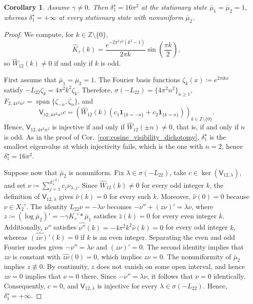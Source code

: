 \documentclass[letterpaper, 10pt, conference]{ieeeconf}
\newtheorem{corollary}[theorem]{Corollary}
\newcommand{\ind}{\mathbf{1}}
\begin{document}
\begin{corollary}
    \label{cor:cell_sorting_visibility_dichotomy}
    Assume $\gamma \neq 0$. 
    Then $\delta_1^\star = 16\pi^2$ at the stationary state $\bar\mu_1 = \bar\mu_2 = 1$, whereas $\delta_1^\star = +\infty$ at every stationary state with nonuniform $\bar\mu_2$.
\end{corollary}

\begin{proof}
    We compute, for $k \in \mathbb{Z} \setminus \{0\}$,
    \[
    \widehat{K}_\tau(k) = \frac{e^{-2\pi^2\tau^2(k^2-1)}}{2\pi k} \sin\left(\frac{\pi k}{2}\right),
    \]
    so $\widehat{W}_{12}(k) \neq 0$ if and only if $k$ is odd.
    
    First assume that $\bar\mu_1 = \bar\mu_2 = 1$.
    The Fourier basis functions $\zeta_k(x) \coloneqq e^{2\pi\mathrm{i}k x}$ satisfy $-L_{22} \zeta_k = 4 \pi^2 k^2 \zeta_k$.
    Therefore, $\sigma(-L_{22}) = \{4 \pi^2 n^2\}_{n \ge 1}$, $F_{2, 4\pi^2n^2} = \operatorname{span}\{\zeta_{-n}, \zeta_n\}$,
    and 
    \[
    \mathsf{V}_{12, 4\pi^2 n^2} c = \left(\widehat{W}_{12}(k)(c_1 \ind_{\{k=-n\}} + c_2 \ind_{\{k=n\}})\right)_{k \in \mathbb{Z} \setminus \{0\}}.
    \]
    Hence, $\mathsf{V}_{12,4\pi^2n^2}$ is injective if and only if $\widehat{W}_{12}(\pm n) \neq 0$, that is, if and only if $n$ is odd.
    As in the proof of Cor.~\ref{cor:cosine_visibility_dichotomy}, $\delta_1^\star$ is the smallest eigenvalue at which injectivity fails, which is the one with $n = 2$, hence $\delta_1^\star = 16\pi^2$.
    
    Suppose now that $\bar\mu_2$ is nonuniform.
    Fix $\lambda \in \sigma(-L_{22})$, take $c \in \ker(\mathsf{V}_{12,\lambda})$, and set $\nu \coloneqq \sum_{j=1}^{d_\lambda^{(2)}} c_j \nu_{\lambda,j}$.
    Since $\widehat{W}_{12}(k) \neq 0$ for every odd integer $k$, the definition of $\mathsf{V}_{12,\lambda}$ gives $\widehat\nu(k) = 0$ for every such $k$.
    Moreover, $\widehat\nu(0) = 0$ because $\nu \in X_2'$.
    The identity $L_{22}\nu = -\lambda\nu$ becomes $-\nu'' + (z\nu)' = \lambda\nu$, where $z \coloneqq (\log\bar\mu_2)' = -\gamma K_\tau' \ast \bar\mu_1$ satisfies $\widehat{z}(k) = 0$ for every even integer $k$.
    Additionally, $\nu''$ satisfies $\widehat{\nu''}(k) = -4 \pi^2 k^2 \widehat{\nu}(k) = 0$ for every odd integer $k$, whereas $\widehat{(z \nu)'}(k) = 0$ if $k$ is an even integer.
    Separating the even and odd Fourier modes gives $-\nu'' = \lambda \nu$ and $(z\nu)' = 0$.
    The second identity implies that $z \nu$ is constant with $\widehat{z\nu}(0) = 0$, which implies $z \nu = 0$.
    The nonuniformity of $\bar\mu_2$ implies $z \not \equiv 0$.
    By continuity, $z$ does not vanish on some open interval, and hence $z\nu = 0$ implies that $\nu = 0$ there.
    Since $-\nu'' = \lambda\nu$, it follows that $\nu = 0$ identically.
    Consequently, $c = 0$, and $\mathsf{V}_{12,\lambda}$ is injective for every $\lambda \in \sigma(-L_{22})$. 
    Hence, $\delta_1^\star = +\infty$.
\end{proof}
\end{document}
